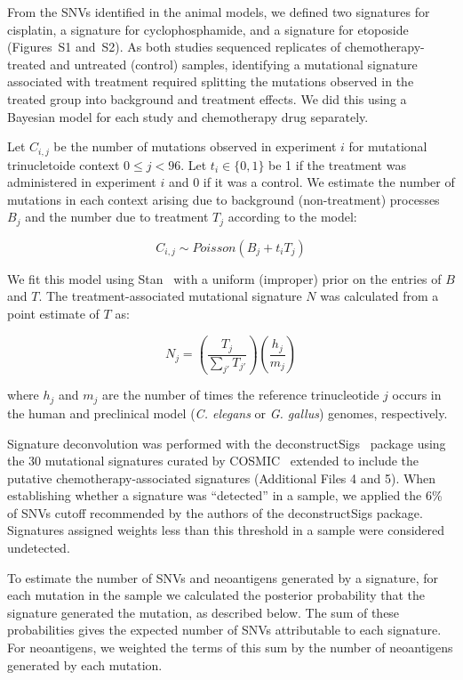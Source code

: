 \documentclass{bmcart}
\begin{document}
From the SNVs identified in the animal models, we defined two signatures for cisplatin, a signature for cyclophosphamide, and a signature for etoposide (Figures~S1 and~S2). As both studies sequenced replicates of chemotherapy-treated and untreated (control) samples, identifying a mutational signature associated with treatment required splitting the mutations observed in the treated group into background and treatment effects. We did this using a Bayesian model for each study and chemotherapy drug separately.

Let $C_{i,j}$ be the number of mutations observed in experiment $i$ for mutational trinucletoide context $0 \leq j < 96$. Let $t_i \in \{0,1\}$ be 1 if the treatment was administered in experiment $i$ and 0 if it was a control. We estimate the number of mutations in each context arising due to background (non-treatment) processes $B_j$ and the number due to treatment $T_j$ according to the model:

\[
C_{i,j} \sim \mathit{Poisson}(B_j + t_i T_j)
\]

We fit this model using Stan~\cite{Gelman_2015} with a uniform (improper) prior on the entries of $B$ and $T$. The treatment-associated mutational signature $N$ was calculated from a point estimate of $T$ as:

\[
N_j = \left ( \frac{T_j}{\sum_{j'}{T_{j'}}} \right ) \left ( \frac{h_j}{m_j} \right )
\]

where $h_j$ and $m_j$ are the number of times the reference trinucleotide $j$ occurs in the human and preclinical model (\textit{C. elegans} or \textit{G. gallus}) genomes, respectively.


Signature deconvolution was performed with the deconstructSigs~\cite{Rosenthal_2016} package using the 30 mutational signatures curated by COSMIC~\cite{364242} extended to include the putative chemotherapy-associated signatures (Additional Files 4 and 5). When establishing whether a signature was ``detected'' in a sample, we applied the 6\% of SNVs cutoff recommended by the authors of the deconstructSigs package. Signatures assigned weights less than this threshold in a sample were considered undetected.


To estimate the number of SNVs and neoantigens generated by a signature, for each mutation in the sample we calculated the posterior probability that the signature generated the mutation, as described below. The sum of these probabilities gives the expected number of SNVs attributable to each signature. For neoantigens, we weighted the terms of this sum by the number of neoantigens generated by each mutation.
\end{document}
